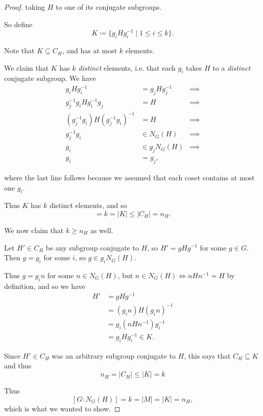 \begin{proof}
taking $H$ to one of its conjugate subgroups.

So define
\[
K \coloneqq 
\{ g_i H g_i^{-1} \mid 1 \leq i \leq k \}.
\]

Note that $K \subseteq C_H$, and has at most $k$ elements.

We claim that $K$ has $k$ \textit{distinct} elements, i.e. that each $g_{i}$ takes $H$ to a \textit{distinct} conjugate subgroup. We have
\begin{align*}
g_{i} H g^{-1}_{i} 
    &= g_{j} H g^{-1}_{j} &\implies \\
g_j^{-1} g_{i} H g^{-1}_{i} g_j 
    &= H &\implies \\
(g_j^{-1} g_{i}) H (g_j^{-1} g_{i})^{-1} 
    &= H &\implies \\
g_j^{-1} g_{i} &\in N_G(H) &\implies \\
g_i &\in g_j N_G(H) &\implies \\
g_i &= g_j,
\end{align*}

where the last line follows because we assumed that each coset contains at most one $g_i$. 

Thus $K$ has $k$ distinct elements, and so 
\begin{equation}
[G : N_G(H)] = k = |K| \leq |C_H| = n_H.
\end{equation}

We now claim that $k \geq n_H$ as well.

Let $H' \in C_H$ be any subgroup conjugate to $H$, so $H' = gHg^{-1}$ for some $g\in G$. Then $g = g_i$ for some $i$, so $g \in g_{i} N_G(H)$. 

Thus $g = g_{i} n$ for some $n\in N_G(H)$, but $n\in N_G(H) \iff nHn^{-1} = H$ by definition, and so we have
\begin{align*}
    H' 
    &= gHg^{-1} \\
    &= (g_i n) H (g_i n)^{-1} \\
    &= g_i (n H n^{-1}) g_i^{-1} \\
    &= g_i H g_i^{-1} \in K.
\end{align*}

Since $H' \in C_H$ was an arbitrary subgroup conjugate to $H$, this says that $C_H \subseteq K$ and thus
\begin{equation}
    n_H = |C_H| \leq |K| = k
\end{equation}

Thus
\[
[G: N_G(H)] = k = |M| = |K| = n_H,
\]
which is what we wanted to show.
\end{proof}

